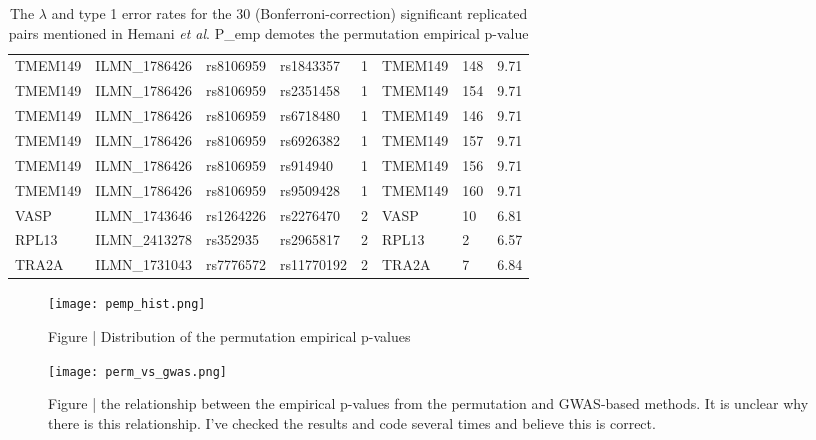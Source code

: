 \documentclass[paper=a4, fontsize=11pt]{scrartcl}         %
\numberwithin{equation}{section}                  %
\numberwithin{figure}{section}                    %
\numberwithin{table}{section}                   %
\begin{document}
\begin{table}[ht]
\begin{tabular}{llllllll}
TMEM149 & ILMN\_1786426 & rs8106959 & rs1843357 & 1 & TMEM149 & 148 & 9.71 \\ 
TMEM149 & ILMN\_1786426 & rs8106959 & rs2351458 & 1 & TMEM149 & 154 & 9.71 \\ 
TMEM149 & ILMN\_1786426 & rs8106959 & rs6718480 & 1 & TMEM149 & 146 & 9.71 \\ 
TMEM149 & ILMN\_1786426 & rs8106959 & rs6926382 & 1 & TMEM149 & 157 & 9.71 \\ 
TMEM149 & ILMN\_1786426 & rs8106959 & rs914940 & 1 & TMEM149 & 156 & 9.71 \\ 
TMEM149 & ILMN\_1786426 & rs8106959 & rs9509428 & 1 & TMEM149 & 160 & 9.71 \\ 
VASP & ILMN\_1743646 & rs1264226 & rs2276470 & 2 & VASP & 10 & 6.81 \\ 
RPL13 & ILMN\_2413278 & rs352935 & rs2965817 & 2 & RPL13 & 2 & 6.57 \\ 
TRA2A & ILMN\_1731043 & rs7776572 & rs11770192 & 2 & TRA2A & 7 & 6.84 \\ 
   \hline
\end{tabular}
\caption*{The $\lambda$ and type 1 error rates for the 30 (Bonferroni-correction) significant replicated pairs mentioned in Hemani \emph{et al}. P\_emp demotes the permutation empirical p-value}
\end{table}


\newpage
\begin{figure}[H]
\centering
\texttt{[image: pemp\_hist.png]}
\caption*{Figure | Distribution of the permutation empirical p-values}
\end{figure}

\begin{figure}[H]
\centering
\texttt{[image: perm\_vs\_gwas.png]}
\caption*{Figure | the relationship between the empirical p-values from the permutation and GWAS-based methods. It is unclear why there is this relationship. I've checked the results and code several times and believe this is correct.}
\end{figure}


\newpage
\end{document}
